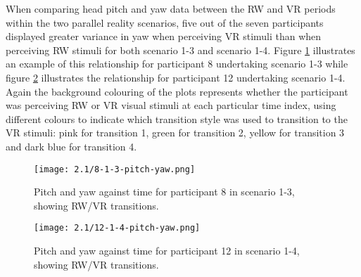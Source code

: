 When comparing head pitch and yaw data between the RW and VR periods within the two parallel reality scenarios, five out of the seven participants displayed greater variance in yaw when perceiving VR stimuli than when perceiving RW stimuli for both scenario 1-3 and scenario 1-4. Figure \ref{8-1-3-pitch-yaw.png} illustrates an example of this relationship for participant 8 undertaking scenario 1-3 while figure \ref{12-1-4-pitch-yaw.png} illustrates the relationship for participant 12 undertaking scenario 1-4. Again the background colouring of the plots represents whether the participant was perceiving RW or VR visual stimuli at each particular time index, using different colours to indicate which transition style was used to transition to the VR stimuli: pink for transition 1, green for transition 2, yellow for transition 3 and dark blue for transition 4.

\begin{figure}
	\begin{center}
	\texttt{[image: 2.1/8-1-3-pitch-yaw.png]}
	\caption{Pitch and yaw against time for participant 8 in scenario 1-3, showing RW/VR transitions.}
	\label{8-1-3-pitch-yaw.png}
	\end{center}
\end{figure}


\begin{figure}
	\begin{center}
	\texttt{[image: 2.1/12-1-4-pitch-yaw.png]}
	\caption{Pitch and yaw against time for participant 12 in scenario 1-4, showing RW/VR transitions.}
	\label{12-1-4-pitch-yaw.png}
	\end{center}
\end{figure}

